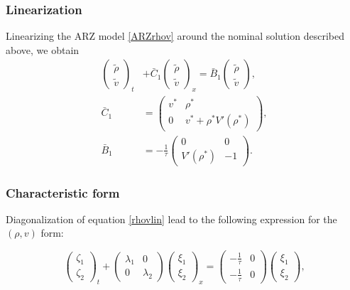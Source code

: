 \documentclass[a4paper, 10pt, conference]{ieeeconf}      %
\begin{document}
\subsubsection{Linearization}
Linearizing the ARZ model \eqref{ARZrhov} around the nominal solution described above, we obtain
{\footnotesize
\begin{subequations} \label{rhovlin}
\begin{align}
\begin{pmatrix}
	\tilde{\rho} \\
	\tilde{v}
\end{pmatrix}_t
&+ \bar{C}_1
\begin{pmatrix}
	\tilde{\rho} \\ 
	\tilde{v}
\end{pmatrix}_x 
= 
\bar{B}_1
\begin{pmatrix}
	\tilde{\rho} \\
	\tilde{v}
\end{pmatrix}, \\
\bar{C}_1
&= 
\begin{pmatrix}
	v^* & \rho^* \\
	0 & v^* + \rho^* V' ( \rho^*) 
\end{pmatrix}, \\
\bar{B}_1 
&= 
-\frac{1}{\tau}
\begin{pmatrix}
	0 & 0 \\
	V'\left( \rho^{*} \right) & -1
\end{pmatrix}.
\end{align}
\end{subequations}
}

\subsubsection{Characteristic form}
Diagonalization of equation \eqref{rhovlin} lead to the following expression for the $\left( \rho, v \right)$ form:

{\footnotesize
\begin{equation}
\begin{pmatrix}
	\zeta_1 \\ 
	\zeta_2
\end{pmatrix}_t
+ 
\begin{pmatrix}
	\lambda_1 & 0 
	\\
	0 & \lambda_2 
\end{pmatrix}
\begin{pmatrix}
	\xi_1 \\ 
	\xi_2
\end{pmatrix}_x
= 
\begin{pmatrix}
	-\frac{1}{\tau} & 0 \\
	-\frac{1}{\tau} & 0
\end{pmatrix}
\begin{pmatrix}
\xi_1 \\ \xi_2
\end{pmatrix},
\end{equation}
}
\end{document}
